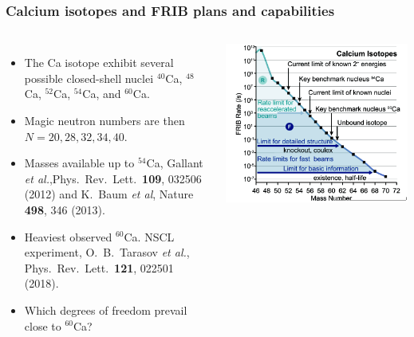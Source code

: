 \documentclass[compress]{beamer}
\begin{document}
\frame
    {
      \frametitle{Calcium isotopes and FRIB plans and capabilities}
      \begin{footnotesize}
     \begin{columns}
      \column{5.0cm}
\begin{itemize}
\item The Ca  isotope exhibit several possible closed-shell nuclei $^{40}$Ca, $^{48}$Ca, $^{52}$Ca, $^{54}$Ca,
and  $^{60}$Ca. 
\item  Magic neutron numbers are then $N=20, 28, 32, 34, 40$. 
\item Masses available up to $^{54}$Ca, Gallant {\em et al.},Phys.~Rev.~Lett.~{\bf 109}, 032506 (2012) and K.~Baum {\em et al}, Nature {\bf 498}, 346 (2013).
\item Heaviest observed $^{60}$Ca. NSCL experiment,  O.~B.~Tarasov {\it et al.}, Phys.~Rev.~Lett.~{\bf 121}, 022501 (2018).
\item Which degrees of freedom prevail close to $^{60}$Ca?
\end{itemize}
\column{6cm}
      \begin{center}
	\includegraphics[width=1.15\textwidth]{Figures/careach.png}
      \end{center}
\end{columns}
      \end{footnotesize}
    }
\end{document}
